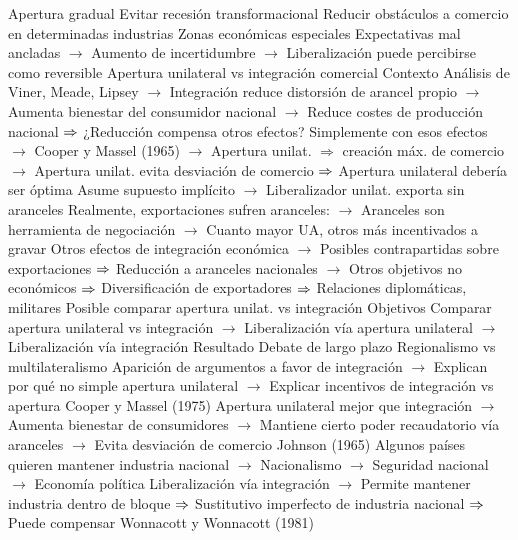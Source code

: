 \documentclass{nuevotema}
\begin{document}
\begin{esquemal}
				\4 Apertura gradual
				\4[] Evitar recesión transformacional
				\4[] Reducir obstáculos a comercio en determinadas industrias
				\4[] Zonas económicas especiales
				\4[] Expectativas mal ancladas
				\4[] $\to$ Aumento de incertidumbre
				\4[] $\to$ Liberalización puede percibirse como reversible
			\3 Apertura unilateral vs integración comercial
				\4 Contexto
				\4[] Análisis de Viner, Meade, Lipsey
				\4[] $\to$ Integración reduce distorsión de arancel propio
				\4[] $\to$ Aumenta bienestar del consumidor nacional
				\4[] $\to$ Reduce costes de producción nacional
				\4[] $\Rightarrow$ ¿Reducción compensa otros efectos?
				\4[] Simplemente con esos efectos
				\4[] $\to$ Cooper y Massel (1965)
				\4[] $\to$ Apertura unilat. $\Rightarrow$ creación máx. de comercio
				\4[] $\to$ Apertura unilat. evita desviación de comercio
				\4[] $\Rightarrow$ Apertura unilateral debería ser óptima
				\4[] Asume supuesto implícito
				\4[] $\to$ Liberalizador unilat. exporta sin aranceles
				\4[] Realmente, exportaciones sufren aranceles:
				\4[] $\to$ Aranceles son herramienta de negociación
				\4[] $\to$ Cuanto mayor UA, otros más incentivados a gravar
				\4[] Otros efectos de integración económica
				\4[] $\to$ Posibles contrapartidas sobre exportaciones
				\4[] $\Rightarrow$ Reducción a aranceles nacionales
				\4[] $\to$ Otros objetivos no económicos
				\4[] $\Rightarrow$ Diversificación de exportadores
				\4[] $\Rightarrow$ Relaciones diplomáticas, militares
				\4[] Posible comparar apertura unilat. vs integración
				\4 Objetivos
				\4[] Comparar apertura unilateral vs integración
				\4[] $\to$ Liberalización vía apertura unilateral
				\4[] $\to$ Liberalización vía integración
				\4 Resultado
				\4[] Debate de largo plazo
				\4[] Regionalismo vs multilateralismo
				\4[] Aparición de argumentos a favor de integración
				\4[] $\to$ Explican por qué no simple apertura unilateral
				\4[] $\to$ Explicar incentivos de integración vs apertura
				\4 Cooper y Massel (1975)
				\4[] Apertura unilateral mejor que integración
				\4[] $\to$ Aumenta bienestar de consumidores
				\4[] $\to$ Mantiene cierto poder recaudatorio vía aranceles
				\4[] $\to$ Evita desviación de comercio
				\4 Johnson (1965)
				\4[] Algunos países quieren mantener industria nacional
				\4[] $\to$ Nacionalismo
				\4[] $\to$ Seguridad nacional
				\4[] $\to$ Economía política
				\4[] Liberalización vía integración
				\4[] $\to$ Permite mantener industria dentro de bloque
				\4[] $\Rightarrow$ Sustitutivo imperfecto de industria nacional
				\4[] $\Rightarrow$ Puede compensar
				\4 Wonnacott y Wonnacott (1981)

\end{esquemal}
\end{document}
